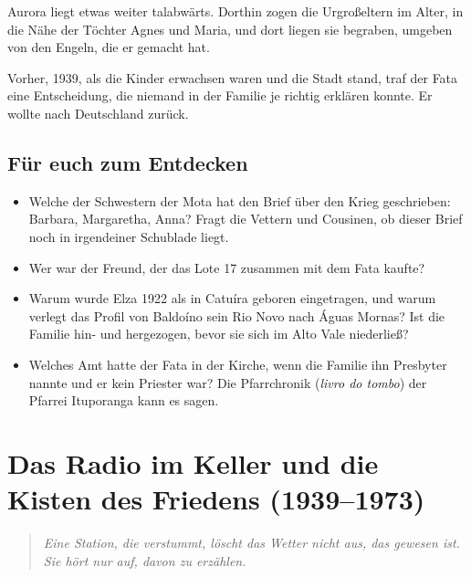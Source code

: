 \documentclass[
  ngerman,
  11pt,
  openany]{book}
\providecommand{\tightlist}{%
  \setlength{\itemsep}{0pt}\setlength{\parskip}{0pt}}
\begin{document}
Aurora liegt etwas weiter talabwärts. Dorthin zogen die Urgroßeltern im
Alter, in die Nähe der Töchter Agnes und Maria, und dort liegen sie
begraben, umgeben von den Engeln, die er gemacht hat.

Vorher, 1939, als die Kinder erwachsen waren und die Stadt stand, traf
der Fata eine Entscheidung, die niemand in der Familie je richtig
erklären konnte. Er wollte nach Deutschland zurück.

\section{Für euch zum Entdecken}\label{fuxfcr-euch-zum-entdecken-5}

\begin{itemize}
\tightlist
\item
  Welche der Schwestern der Mota hat den Brief über den Krieg
  geschrieben: Barbara, Margaretha, Anna? Fragt die Vettern und
  Cousinen, ob dieser Brief noch in irgendeiner Schublade liegt.
\item
  Wer war der Freund, der das Lote 17 zusammen mit dem Fata kaufte?
\item
  Warum wurde Elza 1922 als in Catuíra geboren eingetragen, und warum
  verlegt das Profil von Baldoíno sein Rio Novo nach Águas Mornas? Ist
  die Familie hin- und hergezogen, bevor sie sich im Alto Vale
  niederließ?
\item
  Welches Amt hatte der Fata in der Kirche, wenn die Familie ihn
  Presbyter nannte und er kein Priester war? Die Pfarrchronik
  (\emph{livro do tombo}) der Pfarrei Ituporanga kann es sagen.
\end{itemize}

\chapter{Das Radio im Keller und die Kisten des Friedens
(1939--1973)}\label{cap-7}

\begin{quote}
\emph{Eine Station, die verstummt, löscht das Wetter nicht aus, das
gewesen ist. Sie hört nur auf, davon zu erzählen.}
\end{quote}
\end{document}
